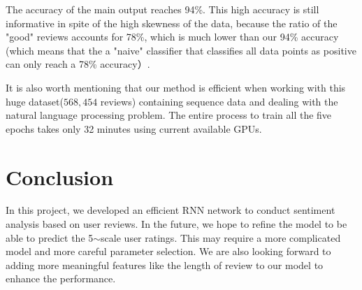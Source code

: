 \documentclass[letterpaper]{article} %
\begin{document}
The accuracy of the main output reaches 94\%.  This high accuracy is still informative in spite of the high skewness of the data, because the ratio of the "good" reviews accounts for 78\%, which is much lower than our 94\% accuracy (which means that the a "naive" classifier that classifies all data points as positive can only reach a 78\% accuracy）.

It is also worth mentioning that our method is efficient when working with this huge dataset($568,454$ reviews) containing sequence data and dealing with the natural language processing problem. The entire process to train all the five epochs takes only 32 minutes using current available GPUs.   

\section{Conclusion}
In this project, we developed an efficient RNN network to conduct sentiment analysis based on user reviews. In the future, we hope to refine the model to be able to predict the 5$\sim$scale user ratings. This may require a more complicated model and more careful parameter selection. We are also looking forward to adding more meaningful features like the length of review to our model to enhance the performance. 
\end{document}
